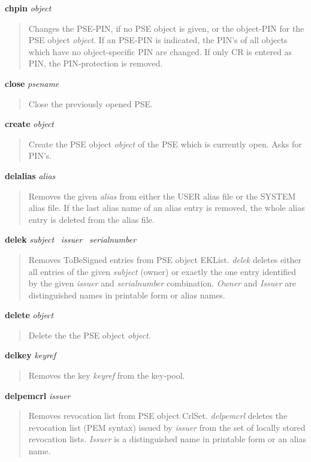 {\bf chpin} {\em object}
\begin{quote}
Changes the PSE-PIN, if no PSE object is given, or the object-PIN for the PSE object {\em object}. 
If an PSE-PIN is indicated, the PIN's of all objects which have
no object-specific PIN are changed. If only CR is entered as PIN, the PIN-protection is removed.
\end{quote}

{\bf close} {\em psename}
\begin{quote}
Close the previously opened PSE.
\end{quote}

{\bf create} {\em object}
\begin{quote}
Create the PSE object {\em object}
of the PSE which is currently open. Asks for PIN's.
\end{quote}

{\bf delalias} {\em alias}
\begin{quote}
Removes the given {\em alias} from either the USER alias file or the SYSTEM alias file. If the
last alias name of an alias entry is removed, the whole alias entry is deleted from the alias file.
\end{quote}

{\bf delek} {\em subject}~ {\em issuer}~ {\em serialnumber}
\begin{quote}
Removes ToBeSigned entries from PSE object EKList.
{\em delek} deletes either all entries of the given {\em subject} (owner) or exactly the one entry identified by 
the
given {\em issuer} and {\em serialnumber} combination. {\em Owner} and {\em Issuer} are distinguished
names in printable form or alias names.
\end{quote}

{\bf delete} {\em object}
\begin{quote}
Delete the the PSE object {\em object}. 
\end{quote}

{\bf delkey} {\em keyref} 
\begin{quote}
Removes the key {\em keyref} from the key-pool.
\end{quote}

{\bf delpemcrl} {\em issuer}
\begin{quote}
Removes revocation list from PSE object CrlSet.
{\em delpemcrl} deletes the revocation list (PEM syntax) issued by {\em issuer} from the set of 
locally stored revocation lists. {\em Issuer} is a distinguished name in printable form or an alias name.
\end{quote}

